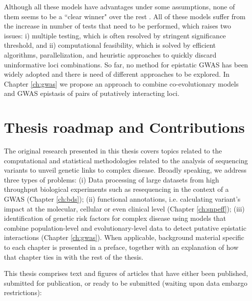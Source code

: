 Although all these models have advantages under some assumptions, none of them seems to be a ``clear winner" over the rest \cite{cordell2009detecting}. All of these models suffer from the increase in number of tests that need to be performed, which raises two issues: i) multiple testing, which is often resolved by stringent significance threshold, and ii) computational feasibility, which is solved by efficient algorithms, parallelization, and heuristic approaches to quickly discard uninformative loci combinations. So far, no method for epistatic GWAS has been widely adopted and there is need of different approaches to be explored. In Chapter \ref{ch:gwas} we propose an approach to combine co-evolutionary models and GWAS epistasis of pairs of putatively interacting loci.


\section{Thesis roadmap and Contributions}

The original research presented in this thesis covers topics related to the computational and statistical methodologies related to the analysis of sequencing variants to unveil genetic links to complex disease. Broadly speaking, we address three types of problems: (i) Data processing of large datasets from high throughput biological experiments such as resequencing in the context of a GWAS (Chapter \ref{ch:bds}); (ii) functional annotations, i.e. calculating variant's impact at the molecular, cellular or even clinical level (Chapter \ref{ch:snpeff}); (iii) identification of genetic risk factors for complex disease using models that combine population-level and evolutionary-level data to detect putative epistatic interactions (Chapter \ref{ch:gwas}). When applicable, background material specific to each chapter is presented in a preface, together with an explanation of how that chapter ties in with the rest of the thesis.

This thesis comprises text and figures of articles that have either been published, submitted for publication, or ready to be submitted (waiting upon data embargo restrictions):
\\

